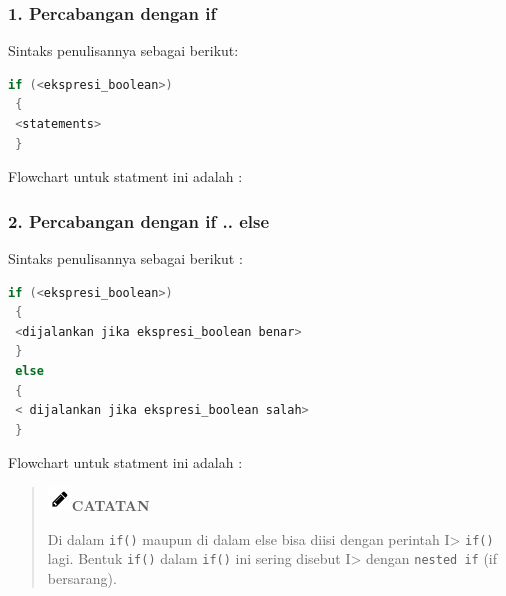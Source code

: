 \subsubsection{1. Percabangan dengan if}\label{percabangan-dengan-if}

Sintaks penulisannya sebagai berikut:

\begin{lstlisting}[language=c++, numbers=none]
 if (<ekspresi_boolean>)
 {
 <statements>
 }
\end{lstlisting}

Flowchart untuk statment ini adalah :


\subsubsection{2. Percabangan dengan if .. else}\label{percabangan-dengan-if-..-else}

Sintaks penulisannya sebagai berikut :

\begin{lstlisting}[language=c++]
 if (<ekspresi_boolean>)
 {
 <dijalankan jika ekspresi_boolean benar>
 }
 else
 {
 < dijalankan jika ekspresi_boolean salah>
 }
\end{lstlisting}

Flowchart untuk statment ini adalah :

\begin{quotation}
\includegraphics{../manuscript/images/pencil.png}\textbf{CATATAN} 

Di
dalam \texttt{if()} maupun di dalam else bisa diisi dengan perintah
I\textgreater{} \texttt{if()} lagi. Bentuk \texttt{if()} dalam
\texttt{if()} ini sering disebut I\textgreater{} dengan
\texttt{nested\ if} (if bersarang).
\end{quotation}

